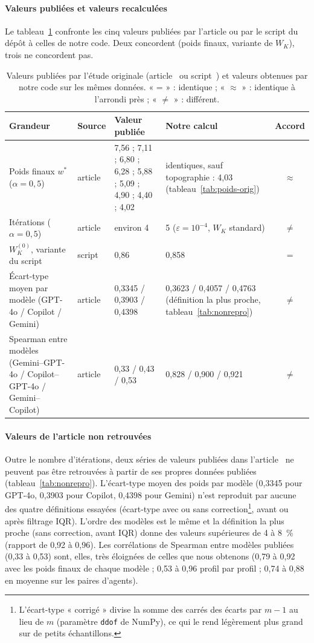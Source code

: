 \documentclass[11pt,a4paper]{article}
\newcommand{\code}[1]{\texttt{#1}}
\begin{document}
\paragraph{Valeurs publiées et valeurs recalculées} Le tableau~\ref{tab:publie} confronte les cinq valeurs publiées par l'article ou par le script du dépôt à celles de notre code. Deux concordent (poids finaux, variante de $W_K$), trois ne concordent pas.

\begin{table}[htbp]
\centering
\caption{Valeurs publiées par l'étude originale (article~\cite{vahidnia} ou script~\cite{masllms}) et valeurs obtenues par notre code sur les mêmes données. « = » : identique ; « $\approx$ » : identique à l'arrondi près ; « $\neq$ » : différent.}
\label{tab:publie}
\small
\begin{tabular}{@{}p{3.8cm}p{1.1cm}p{3.7cm}p{4.9cm}c@{}}
\toprule
Grandeur & Source & Valeur publiée & Notre calcul & Accord \\
\midrule
Poids finaux $w^*$ ($\alpha=0{,}5$) & article & 7,56 ; 7,11 ; 6,80 ; 6,28 ; 5,88 ; 5,09 ; 4,90 ; 4,40 ; 4,02 & identiques, sauf topographie : 4,03 (tableau~\ref{tab:poids-orig}) & $\approx$ \\
Itérations ($\alpha=0{,}5$) & article & environ 4 & 5 ($\varepsilon=10^{-4}$, $W_K$ standard) & $\neq$ \\
$W_K^{(0)}$, variante du script & script & 0,86 & 0,858 & = \\
Écart-type moyen par modèle (GPT-4o / Copilot / Gemini) & article & 0,3345 / 0,3903 / 0,4398 & 0,3623 / 0,4057 / 0,4763 (définition la plus proche, tableau~\ref{tab:nonrepro}) & $\neq$ \\
Spearman entre modèles (Gemini--GPT-4o / Copilot--GPT-4o / Gemini--Copilot) & article & 0,33 / 0,43 / 0,53 & 0,828 / 0,900 / 0,921 & $\neq$ \\
\bottomrule
\end{tabular}
\end{table}

\paragraph{Valeurs de l'article non retrouvées} Outre le nombre d'itérations, deux séries de valeurs publiées dans l'article~\cite{vahidnia} ne peuvent pas être retrouvées à partir de ses propres données publiées (tableau~\ref{tab:nonrepro}). L'écart-type moyen des poids par modèle (0,3345 pour GPT-4o, 0,3903 pour Copilot, 0,4398 pour Gemini) n'est reproduit par aucune des quatre définitions essayées (écart-type avec ou sans correction\footnote{L'écart-type « corrigé » divise la somme des carrés des écarts par $m-1$ au lieu de $m$ (paramètre \code{ddof} de NumPy), ce qui le rend légèrement plus grand sur de petits échantillons.}, avant ou après filtrage IQR). L'ordre des modèles est le même et la définition la plus proche (sans correction, avant IQR) donne des valeurs supérieures de 4 à 8~\% (rapport de 0,92 à 0,96). Les corrélations de Spearman entre modèles publiées (0,33 à 0,53) sont, elles, très éloignées de celles que nous obtenons (0,79 à 0,92 avec les poids finaux de chaque modèle ; 0,53 à 0,96 profil par profil ; 0,74 à 0,88 en moyenne sur les paires d'agents).
\end{document}
